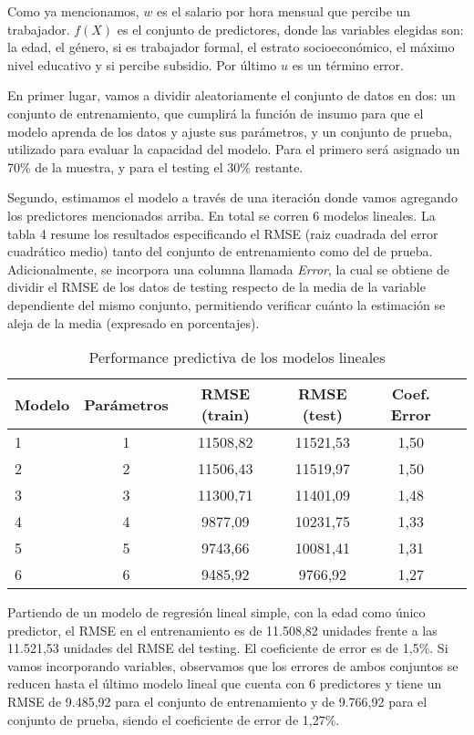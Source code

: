 \documentclass[11pt,oneside]{article}
\begin{document}
	Como ya mencionamos, $w$ es el salario por hora mensual que percibe un trabajador. $f(X)$ es el conjunto de predictores, donde las variables elegidas son: la edad, el género, si es trabajador formal, el estrato socioeconómico, el máximo nivel educativo y si percibe subsidio. Por último $u$ es un término error.
	
	En primer lugar, vamos a dividir aleatoriamente el conjunto de datos en dos: un conjunto de entrenamiento, que cumplirá la función de insumo para que el modelo aprenda de los datos y ajuste sus parámetros, y un conjunto de prueba, utilizado para evaluar la capacidad del modelo. Para el primero será asignado un 70\% de la muestra, y para el testing el 30\% restante.
	
	Segundo, estimamos el modelo a través de una iteración donde vamos agregando los predictores mencionados arriba. En total se corren 6 modelos lineales. La tabla 4 resume los resultados especificando el RMSE (raiz cuadrada del error cuadrático medio) tanto del conjunto de entrenamiento como del de prueba. Adicionalmente, se incorpora una columna llamada \textit{Error}, la cual se obtiene de dividir el RMSE de los datos de testing respecto de la media de la variable dependiente del mismo conjunto, permitiendo verificar cuánto la estimación se aleja de la media (expresado en porcentajes). 
	
	\begin{table}[H]
		\centering
        \caption{Performance predictiva de los modelos lineales}
		\begin{tabular}{lccccc}
			\hline
			\textbf{Modelo} & \textbf{Parámetros} & \textbf{RMSE (train)} & \textbf{RMSE (test)} & \textbf{Coef. Error} \\ \hline
			1 & 1 & 11508,82 & 11521,53 & 1,50 \\ 
			2 & 2 & 11506,43 & 11519,97 & 1,50 \\ 
			3 & 3 & 11300,71 & 11401,09 & 1,48 \\ 
			4 & 4 & 9877,09  & 10231,75 & 1,33 \\ 
			5 & 5 & 9743,66  & 10081,41 & 1,31 \\ 
			6 & 6 & 9485,92  & 9766,92  & 1,27 \\ \hline
		\end{tabular}
		\label{tab:modelos_rmse}
	\end{table}
	
	Partiendo de un modelo de regresión lineal simple, con la edad como único predictor, el RMSE en el entrenamiento es de 11.508,82 unidades frente a las 11.521,53 unidades del RMSE del testing. El coeficiente de error es de 1,5\%. Si vamos incorporando variables, observamos que los errores de ambos conjuntos se reducen hasta el último modelo lineal que cuenta con 6 predictores y tiene un RMSE de 9.485,92 para el conjunto de entrenamiento y de 9.766,92 para el conjunto de prueba, siendo el coeficiente de error de 1,27\%. 
	
\end{document}
